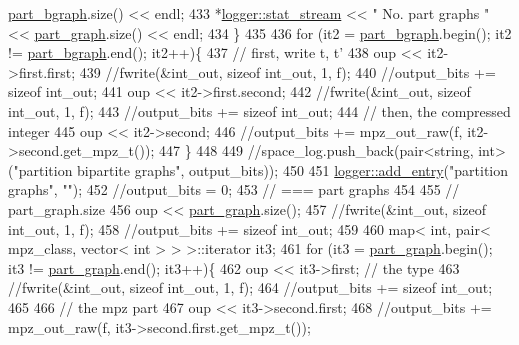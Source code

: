 \begin{DoxyCode}
      \hyperlink{classmarked__graph__compressed_a7b3267063fba30b45eb21b3ba4e07536}{part\_bgraph}.size() << endl;
433     *\hyperlink{classlogger_a7db37821f875f2ba3540980b355779f5}{logger::stat\_stream} << \textcolor{stringliteral}{" No. part graphs   "} << 
      \hyperlink{classmarked__graph__compressed_ae179a4737e6eab905c18a94d44ef64b7}{part\_graph}.size() << endl;
434   \}
435 
436   \textcolor{keywordflow}{for} (it2 = \hyperlink{classmarked__graph__compressed_a7b3267063fba30b45eb21b3ba4e07536}{part\_bgraph}.begin(); it2 != \hyperlink{classmarked__graph__compressed_a7b3267063fba30b45eb21b3ba4e07536}{part\_bgraph}.end(); it2++)\{
437     \textcolor{comment}{// first, write t, t'}
438     oup << it2->first.first;
439     \textcolor{comment}{//fwrite(&int\_out, sizeof int\_out, 1, f);}
440     \textcolor{comment}{//output\_bits += sizeof int\_out;}
441     oup <<  it2->first.second;
442     \textcolor{comment}{//fwrite(&int\_out, sizeof int\_out, 1, f);}
443     \textcolor{comment}{//output\_bits += sizeof int\_out;}
444     \textcolor{comment}{// then, the compressed integer}
445     oup << it2->second;
446     \textcolor{comment}{//output\_bits += mpz\_out\_raw(f, it2->second.get\_mpz\_t());}
447   \}
448 
449   \textcolor{comment}{//space\_log.push\_back(pair<string, int> ("partition bipartite graphs", output\_bits));}
450 
451   \hyperlink{classlogger_a710163deb17bc81f70d53d285b8ac9ac}{logger::add\_entry}(\textcolor{stringliteral}{"partition graphs"}, \textcolor{stringliteral}{""});
452   \textcolor{comment}{//output\_bits = 0;}
453   \textcolor{comment}{// === part graphs}
454 
455   \textcolor{comment}{// part\_graph.size}
456   oup <<  \hyperlink{classmarked__graph__compressed_ae179a4737e6eab905c18a94d44ef64b7}{part\_graph}.size();
457   \textcolor{comment}{//fwrite(&int\_out, sizeof int\_out, 1, f);}
458   \textcolor{comment}{//output\_bits += sizeof int\_out;}
459 
460   map< int, pair< mpz\_class, vector< int > > >::iterator it3;
461   \textcolor{keywordflow}{for} (it3 = \hyperlink{classmarked__graph__compressed_ae179a4737e6eab905c18a94d44ef64b7}{part\_graph}.begin(); it3 != \hyperlink{classmarked__graph__compressed_ae179a4737e6eab905c18a94d44ef64b7}{part\_graph}.end(); it3++)\{
462     oup <<  it3->first; \textcolor{comment}{// the type}
463     \textcolor{comment}{//fwrite(&int\_out, sizeof int\_out, 1, f);}
464     \textcolor{comment}{//output\_bits += sizeof int\_out;}
465 
466     \textcolor{comment}{// the mpz part}
467     oup << it3->second.first;
468     \textcolor{comment}{//output\_bits += mpz\_out\_raw(f, it3->second.first.get\_mpz\_t());}

\end{DoxyCode}
